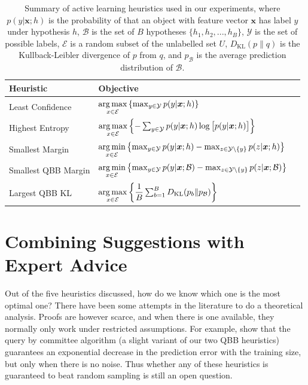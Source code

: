 \documentclass[fleqn,10pt,lineno]{wlpeerj} %
\newcommand{\B}{\mathcal{B}}
\newcommand{\Y}{\mathcal{Y}}
\newcommand{\Ecal}{\mathcal{E}}
\newcommand*{\argmin}{\operatornamewithlimits{arg\,min}\limits}
\newcommand*{\argmax}{\operatornamewithlimits{arg\,max}\limits}
\begin{document}
\begin{table}[h]
	\caption {Summary of active learning heuristics used in our experiments,
			  where $p(y | \bm{x}; h)$ is the probability of that an object
			  with feature vector $\bm{x}$ has label $y$ under hypothesis $h$,
			  $\B$ is the set of $B$ hypotheses $\{h_1, h_2, ..., h_B\}$,
			  $\Y$ is the set of possible labels, $\Ecal$ is a random subset of
			  the unlabelled set $U$, $D_{\mathrm{KL}}(p\|q)$ is the
			  Kullback-Leibler divergence of $p$ from $q$, and $p_\B$ is the
			  average prediction distribution of $\B$.}
	\label{tab:heuristics}
	\centering
	\begin{tabular}{lll}
		\toprule
		{Heuristic}  &  Objective  \\
		\midrule
        Least Confidence &
			$\argmax_{x \in \Ecal}
			\left\{ \max_{y \in \Y} p(y | \bm{x}; h) \right\}$ \\
		Highest Entropy &
			$\argmax_{x \in \Ecal} \left\{-\sum_{y \in \Y} p(y | \bm{x}; h)
            \log \big[ p(y | \bm{x}; h) \big] \right\}$
			\\[2ex]
		Smallest Margin &
			$\argmin_{x \in \Ecal} \left\{ \max_{y \in \Y} p(y | \bm{x}; h) -
            \max_{z \in \Y \setminus \{y\}} p(z | \bm{x}; h)  \right\}$
			\\[2ex]
		Smallest QBB Margin &
			$\argmin_{x \in \Ecal} \left\{ \max_{y \in \Y} p(y | \bm{x}; \B) -
            \max_{z \in \Y \setminus \{y\}} p(z | \bm{x}; \B)  \right\}$
			\\[2ex]
		Largest QBB KL &
			$\argmax_{x \in \Ecal} \left\{ \dfrac{1}{B}
               \sum_{b=1}^B D_{\mathrm{KL}}(p_b\|p_\B) \right\}$
			\\
		\bottomrule
	\end{tabular}
\end{table}

\section*{Combining Suggestions with Expert Advice}

Out of the five heuristics discussed, how do we know which one is the most
optimal one? There have been some attempts in the literature to do a
theoretical analysis. Proofs are however scarce, and when there is one
available, they normally only work under restricted assumptions. For example,
\cite{freund97} show that the query by committee algorithm (a slight variant of
our two QBB heuristics) guarantees an exponential decrease in the prediction
error with the training size, but only when there is no noise. Thus whether any
of these heuristics is guaranteed to beat random sampling is still an open
question.
\end{document}
